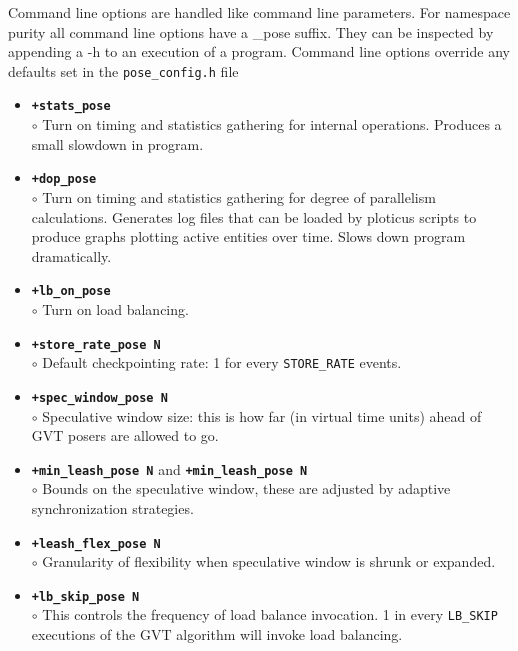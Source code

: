 Command line options are handled like \charmpp{} command line
parameters.  For namespace purity all \pose{} command line options
have a \_pose suffix.  They can be inspected by appending a -h to an
execution of a \pose{} program.  Command line options override any
defaults set in the {\tt pose\_config.h} file

\begin{itemize}
\item {\tt {\bf +stats\_pose}}\\
	$\circ$ Turn on timing and statistics gathering for internal \pose{}
	operations.  Produces a small slowdown in program.\\
\item {\tt {\bf +dop\_pose}}\\
	$\circ$ Turn on timing and statistics gathering for degree of parallelism calculations.  Generates log files that can be loaded by ploticus scripts to produce graphs plotting active entities over time.  Slows down program dramatically.\\
\item {\tt {\bf +lb\_on\_pose}}\\
	$\circ$ Turn on \pose{} load balancing.\\
\item {\tt {\bf +store\_rate\_pose N}}\\
	$\circ$ Default checkpointing rate: 1 for every {\tt STORE\_RATE} events.\\
\item {\tt {\bf +spec\_window\_pose N}}\\
	$\circ$ Speculative window size: this is how far (in virtual time units) ahead of GVT posers are allowed to go.\\
\item {\tt {\bf +min\_leash\_pose N}} and {\tt {\bf +min\_leash\_pose N}}\\
	$\circ$ Bounds on the speculative window, these are adjusted by adaptive synchronization strategies.\\
\item {\tt {\bf +leash\_flex\_pose N}}\\
	$\circ$ Granularity of flexibility when speculative window is shrunk or expanded.\\
\item {\tt {\bf +lb\_skip\_pose N}}\\
	$\circ$ This controls the frequency of load balance invocation.  1 in every {\tt LB\_SKIP} executions of the GVT algorithm will invoke load balancing.

\end{itemize}
